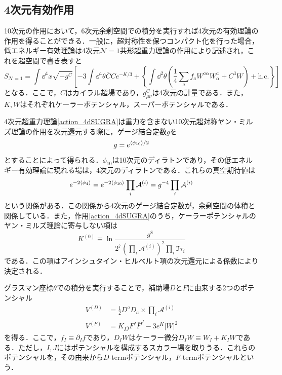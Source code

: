 \documentclass[a4paper,uplatex,dvipdfmx,10pt]{jsarticle}
\theoremstyle{definition}
\begin{document}
\subsection{4次元有効作用}

10次元の作用において，6次元余剰空間での積分を実行すれば4次元の有効理論の作用を得ることができる．一般に，超対称性を保つコンパクト化を行った場合，低エネルギー有効理論は4次元$\mathcal{N}=1$共形超重力理論\cite{Kaku_SuperconformalUnified_1977}の作用により記述され，これを超空間で書き表すと
\begin{equation}
   S_{\mathcal{N}=1}
   =
   \int\dd^{4}x
   \sqrt{-g^{C}}
   \left[  
      -3\int\dd^4 \theta
      \bar{C}Ce^{-K/3}
      +
      \left\{  
         \int\dd^2\theta
         \left(  
            \frac{1}{4}\sum_{a}f_{a}W^{a\alpha}W_{\alpha}^{a}
            +
            C^3W
         \right)
         +
         \text{h.c.}
      \right\}
   \right]
   \label{action_4dSUGRA}
\end{equation}
となる．ここで，$C$はカイラル超場であり，$g_{\mu\nu}^{C}$は4次元の計量である．また，$K,W$はそれぞれケーラーポテンシャル，スーパーポテンシャルである．

4次元超重力理論\eqref{action_4dSUGRA}は重力を含まない10次元超対称ヤン・ミルズ理論の作用を次元還元する際に，ゲージ結合定数$g$を
\begin{equation}
   g
   =
   e^{\ev*{\phi_{10}}/2}
   \nonumber
\end{equation}
とすることによって得られる．$\phi_{10}$は10次元のディラトンであり，その低エネルギー有効理論に現れる場は，4次元のディラトンである．これらの真空期待値は
\begin{equation}
   e^{-2\ev*{\phi_{4}}}
   =
   e^{-2\ev*{\phi_{10}}}\prod_{i}\mathcal{A}^{(i)}
   =
   g^{-4}\prod_{i}\mathcal{A}^{(i)}
   \nonumber
\end{equation}
という関係がある．この関係から4次元のゲージ結合定数が，余剰空間の体積と関係している．また，作用\eqref{action_4dSUGRA}のうち，ケーラーポテンシャルのヤン・ミルズ理論に寄与しない項は
\begin{equation}
   K^{(0)}
   \equiv
   \ln
   \dfrac{g^{8}}{2^7\left( \prod_{i}\mathcal{A}^{(i)} \right)^2 \prod_{i}\Im \tau_{i}}
   \nonumber
\end{equation}
である．この項はアインシュタイン・ヒルベルト項の次元還元による係数により決定される．

グラスマン座標$\theta$での積分を実行することで，補助場$D$と$F$に由来する2つのポテンシャル
\begin{align}
   V^{(D)}
   &=
   \frac{1}{2}D^{a}D_{a}   
   \times
   \prod_{i}\mathcal{A}^{(i)}
   \label{D-term_potential}
   \\
   V^{(F)}
   &=
   K_{I\bar{J}}F^{I}\bar{F}^{\bar{J}}
   -
   3e^{K}|W|^2
   \label{F-term_potential}
\end{align}
を得る．ここで，$f_{I}\equiv\partial_{I}f$であり，$D_{I}W$はケーラー微分$D_{I}W\equiv W_{I}+K_{I}W$である．ただし，$I,J$にはポテンシャルを構成するスカラー場を取りうる．これらのポテンシャルを，その由来から$D$-termポテンシャル，$F$-termポテンシャルという．
\end{document}
